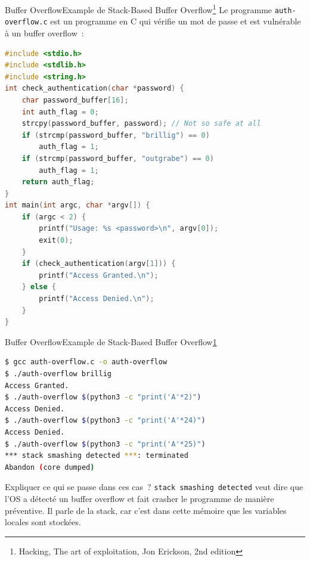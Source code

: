 \documentclass{beamer}
\begin{document}
    \begin{frame}[fragile]{Buffer Overflow}{Example de Stack-Based Buffer Overflow\footnote{\label{hacking}Hacking, The art of exploitation, Jon Erickson, 2nd edition}}
        Le programme \lstinline{auth-overflow.c} est un programme en C qui vérifie un mot de passe et est vulnérable à un buffer overflow~:
        \begin{lstlisting}[language=C,basicstyle=\tiny\ttfamily]
#include <stdio.h>
#include <stdlib.h>
#include <string.h>
int check_authentication(char *password) {
    char password_buffer[16];
    int auth_flag = 0;
    strcpy(password_buffer, password); // Not so safe at all
    if (strcmp(password_buffer, "brillig") == 0)
        auth_flag = 1;
    if (strcmp(password_buffer, "outgrabe") == 0)
        auth_flag = 1;
    return auth_flag;
}
int main(int argc, char *argv[]) {
    if (argc < 2) {
        printf("Usage: %s <password>\n", argv[0]);
        exit(0);
    }
    if (check_authentication(argv[1])) {
        printf("Access Granted.\n");
    } else {
        printf("Access Denied.\n");
    }
}
        \end{lstlisting}
    \end{frame}

    \begin{frame}[fragile]{Buffer Overflow}{Example de Stack-Based Buffer Overflow\cref{hacking}}
        \begin{lstlisting}[language=bash]
$ gcc auth-overflow.c -o auth-overflow
$ ./auth-overflow brillig
Access Granted.
$ ./auth-overflow $(python3 -c "print('A'*2)")
Access Denied.
$ ./auth-overflow $(python3 -c "print('A'*24)")
Access Denied.
$ ./auth-overflow $(python3 -c "print('A'*25)")
*** stack smashing detected ***: terminated
Abandon (core dumped)
        \end{lstlisting}
        Expliquer ce qui se passe dans ces cas~?
        \pause
        \bigbreak
        \lstinline{stack smashing detected} veut dire que l'OS a détecté un buffer overflow et fait crasher le programme de manière préventive.
        Il parle de la stack, car c'est dans cette mémoire que les variables locales sont stockées.
    \end{frame}
\end{document}

